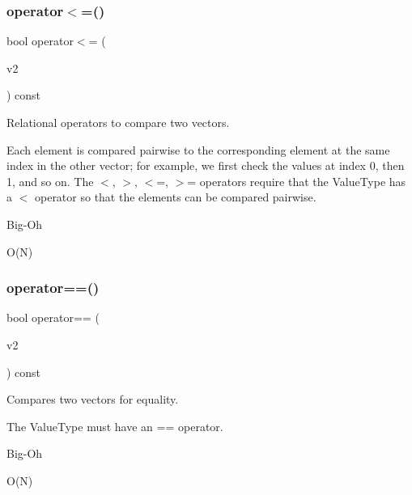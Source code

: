 \subsubsection{\texorpdfstring{operator$<$=()}{operator<=()}}
{\footnotesize\ttfamily bool operator$<$= (\begin{DoxyParamCaption}\item[{const \mbox{\hyperlink{classVector}{Vector}}$<$ Value\+Type $>$ \&}]{v2 }\end{DoxyParamCaption}) const}



Relational operators to compare two vectors. 

Each element is compared pairwise to the corresponding element at the same index in the other vector; for example, we first check the values at index 0, then 1, and so on. The $<$, $>$, $<$=, $>$= operators require that the Value\+Type has a $<$ operator so that the elements can be compared pairwise. \begin{DoxyRefDesc}{Big-\/\+Oh}
\item[\mbox{\hyperlink{BigOh__BigOh000147}{Big-\/\+Oh}}]O(\+N) \end{DoxyRefDesc}
\mbox{\label{classVector_a31eebc4de791cf62b8fa12a0eeca90dc}} 
\subsubsection{\texorpdfstring{operator==()}{operator==()}}
{\footnotesize\ttfamily bool operator== (\begin{DoxyParamCaption}\item[{const \mbox{\hyperlink{classVector}{Vector}}$<$ Value\+Type $>$ \&}]{v2 }\end{DoxyParamCaption}) const}



Compares two vectors for equality. 

The Value\+Type must have an == operator. \begin{DoxyRefDesc}{Big-\/\+Oh}
\item[\mbox{\hyperlink{BigOh__BigOh000144}{Big-\/\+Oh}}]O(\+N) \end{DoxyRefDesc}
\mbox{\label{classVector_a0b8b14442cb420ffaecc0606345e73a1}} 
